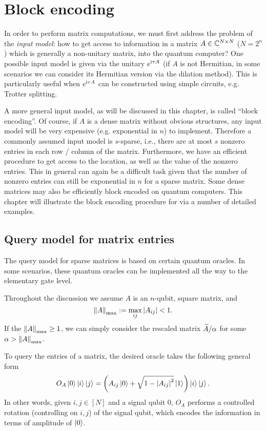 \chapter{Block encoding}

In order to perform matrix computations, we must first address the problem of the \textit{input model}: how to get access to information in a matrix $A\in\mathbb{C}^{N\times N}$ ($N=2^n$) which is generally a non-unitary matrix, into the quantum computer? 
One possible input model is given via the unitary $e^{\mathrm{i} \tau A}$ (if $A$ is not Hermitian, in some scenarios we can consider its Hermitian version via the dilation method). 
This is particularly useful when $e^{\mathrm{i} \tau A}$ can be constructed using simple circuits, e.g. Trotter splitting.

A more general input model, as will be discussed in this chapter, is called ``block encoding''.
Of course, if $A$ is a dense matrix without obvious structures, any input model will be very expensive (e.g. exponential in $n$) to implement.
Therefore a commonly assumed input model is $s$-sparse, i.e., there are at most $s$ nonzero entries in each row / column of the matrix.
Furthermore, we have an efficient procedure to get access to the location, as well as the value of the nonzero entries.
This in general can again be a difficult task given that the number of nonzero entries can still be exponential in $n$ for a sparse matrix.
Some dense matrices may also be efficiently block encoded on quantum computers.
This chapter will illustrate the block encoding procedure for via a number of detailed examples. 

\section{Query model for matrix entries}

The query model for sparse matrices is based on certain quantum oracles. In some scenarios, these quantum oracles can be implemented all the way to the elementary gate level. 

Throughout the discussion we assume $A$ is an $n$-qubit, square matrix, and
\begin{equation}
\left\lVert A\right\rVert_{\max}:=\max_{ij} \left\lvert A_{ij}\right\rvert< 1.
\end{equation}
If the $\left\lVert A\right\rVert_{\max}\ge1$, we can simply consider the rescaled matrix $\widetilde{A}/\alpha$ for some $\alpha>\left\lVert A\right\rVert_{\max}$.

To query the entries of a matrix, the desired oracle takes the following general form
\begin{equation}
O_A \ket{0}\ket{i}\ket{j}=\left(A_{ij}\ket{0}+\sqrt{1-\left\lvert A_{ij}\right\rvert^2}\ket{1}\right)\ket{i}\ket{j}.
\label{eqn:entry_oracle}
\end{equation}
In other words, given $i,j\in[N]$ and a signal qubit $0$, $O_A$ performs a controlled rotation (controlling on $i,j$) of the signal qubit, which encodes the information in terms of amplitude of $\ket{0}$.

